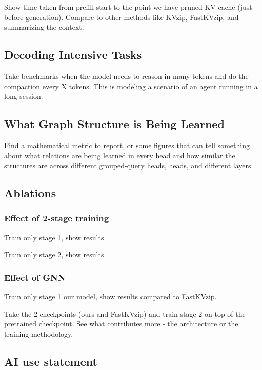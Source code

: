 \documentclass{article} %
\begin{document}
Show time taken from prefill start to the point we have pruned KV cache (just before generation). Compare to other methods like KVzip, FastKVzip, and summarizing the context.



\subsection{Decoding Intensive Tasks}

Take benchmarks when the model needs to reason in many tokens and do the compaction every X tokens. This is modeling a scenario of an agent running in a long session.

\subsection{What Graph Structure is Being Learned}

Find a mathematical metric to report, or some figures that can tell something about what relations are being learned in every head and how similar the structures are across different grouped-query heads, heads, and different layers.

\subsection{Ablations}

\subsubsection{Effect of 2-stage training}

Train only stage 1, show results.

Train only stage 2, show results.

\subsubsection{Effect of GNN}

Train only stage 1 our model, show results compared to FastKVzip.

Take the 2 checkpoints (ours and FastKVzip) and train stage 2 on top of the pretrained checkpoint. See what contributes more - the architecture or the training methodology.

\newpage

\subsection*{AI use statement}
\end{document}
